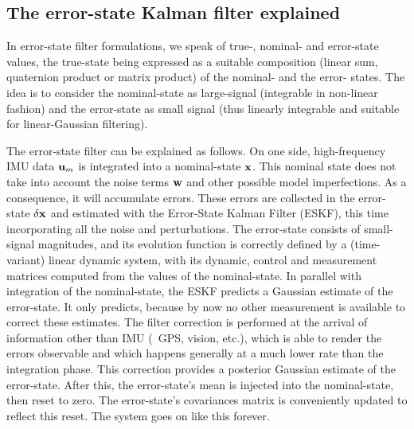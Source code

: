 \subsection{The error-state Kalman filter explained}

In error-state filter formulations, we speak of true-, nominal- and error-state values, the true-state being expressed as a suitable composition (linear sum, quaternion product or matrix product) of the nominal- and the error- states. 
The idea is to consider the nominal-state as large-signal (integrable in non-linear fashion) and the error-state as small signal (thus linearly integrable and suitable for linear-Gaussian filtering). 

The error-state filter can be explained as follows. 
On one side, high-frequency IMU data ${\bf u}_m$ is integrated into a nominal-state ${\bf x}$. 
This nominal state does not take into account the noise terms ${\bf w}$ and other possible model imperfections. 
As a consequence, it will accumulate errors. 
These errors are collected in the error-state $\delta{\bf x}$ and estimated with the  Error-State Kalman Filter (ESKF), this time incorporating all the noise and perturbations. 
The error-state consists of small-signal magnitudes, and its evolution function is correctly defined by a (time-variant) linear dynamic system, with its dynamic, control and measurement matrices computed from the values of the nominal-state. 
In parallel with integration of the nominal-state, the ESKF predicts a Gaussian estimate of the error-state. 
It only predicts, because by now no other measurement is available to correct these estimates. 
The filter correction is performed at the arrival of information other than IMU (\eg~GPS, vision, etc.), which is able to render the errors observable and which  happens generally at a much lower rate than the integration phase. 
This correction provides a posterior Gaussian estimate of the error-state. 
After this, the error-state's mean is injected into the nominal-state, then reset to zero. 
The error-state's covariances matrix is conveniently updated to reflect this reset. 
The system goes on like this forever.

